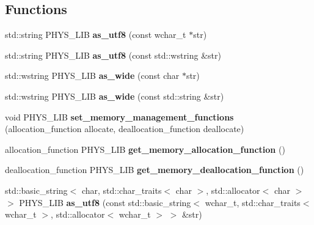 \subsection*{Functions}
\begin{DoxyCompactItemize}
\item 
\hypertarget{namespacephys_1_1xml_aa9bd5708205af50b8b9c739d44859b8f}{
std::string PHYS\_\-LIB {\bfseries as\_\-utf8} (const wchar\_\-t $\ast$str)}
\label{d9/d27/namespacephys_1_1xml_aa9bd5708205af50b8b9c739d44859b8f}

\item 
\hypertarget{namespacephys_1_1xml_aee269289d6244419edd4b81c2586b387}{
std::string PHYS\_\-LIB {\bfseries as\_\-utf8} (const std::wstring \&str)}
\label{d9/d27/namespacephys_1_1xml_aee269289d6244419edd4b81c2586b387}

\item 
\hypertarget{namespacephys_1_1xml_a4c075685a28bbb5a441228b6ef28da99}{
std::wstring PHYS\_\-LIB {\bfseries as\_\-wide} (const char $\ast$str)}
\label{d9/d27/namespacephys_1_1xml_a4c075685a28bbb5a441228b6ef28da99}

\item 
\hypertarget{namespacephys_1_1xml_adc79965f6aaccea720c9aca7309eada4}{
std::wstring PHYS\_\-LIB {\bfseries as\_\-wide} (const std::string \&str)}
\label{d9/d27/namespacephys_1_1xml_adc79965f6aaccea720c9aca7309eada4}

\item 
\hypertarget{namespacephys_1_1xml_af0fc777b09fb1cdc32f2992d1f5e2306}{
void PHYS\_\-LIB {\bfseries set\_\-memory\_\-management\_\-functions} (allocation\_\-function allocate, deallocation\_\-function deallocate)}
\label{d9/d27/namespacephys_1_1xml_af0fc777b09fb1cdc32f2992d1f5e2306}

\item 
\hypertarget{namespacephys_1_1xml_ab410aa42cb0ed412ad7b6f573ae21cf4}{
allocation\_\-function PHYS\_\-LIB {\bfseries get\_\-memory\_\-allocation\_\-function} ()}
\label{d9/d27/namespacephys_1_1xml_ab410aa42cb0ed412ad7b6f573ae21cf4}

\item 
\hypertarget{namespacephys_1_1xml_a00bf38e865e9cd95e3624b3b8b9d7bc9}{
deallocation\_\-function PHYS\_\-LIB {\bfseries get\_\-memory\_\-deallocation\_\-function} ()}
\label{d9/d27/namespacephys_1_1xml_a00bf38e865e9cd95e3624b3b8b9d7bc9}

\item 
\hypertarget{namespacephys_1_1xml_a444b819ff7da13d6da817a71ebcbc30d}{
std::basic\_\-string$<$ char, std::char\_\-traits$<$ char $>$, std::allocator$<$ char $>$ $>$ PHYS\_\-LIB {\bfseries as\_\-utf8} (const std::basic\_\-string$<$ wchar\_\-t, std::char\_\-traits$<$ wchar\_\-t $>$, std::allocator$<$ wchar\_\-t $>$ $>$ \&str)}
\label{d9/d27/namespacephys_1_1xml_a444b819ff7da13d6da817a71ebcbc30d}


\end{DoxyCompactItemize}
